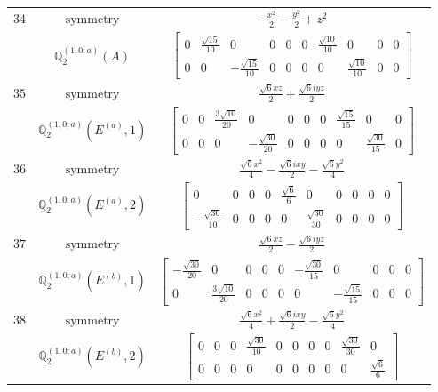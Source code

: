 \documentclass[fleqn,8pt,landscape]{jsarticle}
\begin{document}
\begin{longtable}{ccc}
$ 34 $ & $ \text{symmetry} $ & $ - \frac{x^{2}}{2} - \frac{y^{2}}{2} + z^{2} $ \\
$  $ & $ \mathbb{Q}_{2}^{(1,0;a)}(A) $ & $ \begin{bmatrix} 0 & \frac{\sqrt{15}}{10} & 0 & 0 & 0 & 0 & \frac{\sqrt{10}}{10} & 0 & 0 & 0 \\ 0 & 0 & - \frac{\sqrt{15}}{10} & 0 & 0 & 0 & 0 & \frac{\sqrt{10}}{10} & 0 & 0 \end{bmatrix} $ \\ \hline
$ 35 $ & $ \text{symmetry} $ & $ \frac{\sqrt{6} x z}{2} + \frac{\sqrt{6} i y z}{2} $ \\
$  $ & $ \mathbb{Q}_{2}^{(1,0;a)}(E^{(a)},1) $ & $ \begin{bmatrix} 0 & 0 & \frac{3 \sqrt{10}}{20} & 0 & 0 & 0 & 0 & \frac{\sqrt{15}}{15} & 0 & 0 \\ 0 & 0 & 0 & - \frac{\sqrt{30}}{20} & 0 & 0 & 0 & 0 & \frac{\sqrt{30}}{15} & 0 \end{bmatrix} $ \\ \hline
$ 36 $ & $ \text{symmetry} $ & $ \frac{\sqrt{6} x^{2}}{4} - \frac{\sqrt{6} i x y}{2} - \frac{\sqrt{6} y^{2}}{4} $ \\
$  $ & $ \mathbb{Q}_{2}^{(1,0;a)}(E^{(a)},2) $ & $ \begin{bmatrix} 0 & 0 & 0 & 0 & \frac{\sqrt{6}}{6} & 0 & 0 & 0 & 0 & 0 \\ - \frac{\sqrt{30}}{10} & 0 & 0 & 0 & 0 & \frac{\sqrt{30}}{30} & 0 & 0 & 0 & 0 \end{bmatrix} $ \\ \hline
$ 37 $ & $ \text{symmetry} $ & $ \frac{\sqrt{6} x z}{2} - \frac{\sqrt{6} i y z}{2} $ \\
$  $ & $ \mathbb{Q}_{2}^{(1,0;a)}(E^{(b)},1) $ & $ \begin{bmatrix} - \frac{\sqrt{30}}{20} & 0 & 0 & 0 & 0 & - \frac{\sqrt{30}}{15} & 0 & 0 & 0 & 0 \\ 0 & \frac{3 \sqrt{10}}{20} & 0 & 0 & 0 & 0 & - \frac{\sqrt{15}}{15} & 0 & 0 & 0 \end{bmatrix} $ \\ \hline
$ 38 $ & $ \text{symmetry} $ & $ \frac{\sqrt{6} x^{2}}{4} + \frac{\sqrt{6} i x y}{2} - \frac{\sqrt{6} y^{2}}{4} $ \\
$  $ & $ \mathbb{Q}_{2}^{(1,0;a)}(E^{(b)},2) $ & $ \begin{bmatrix} 0 & 0 & 0 & \frac{\sqrt{30}}{10} & 0 & 0 & 0 & 0 & \frac{\sqrt{30}}{30} & 0 \\ 0 & 0 & 0 & 0 & 0 & 0 & 0 & 0 & 0 & \frac{\sqrt{6}}{6} \end{bmatrix} $ \\ \hline

\end{longtable}
\end{document}
